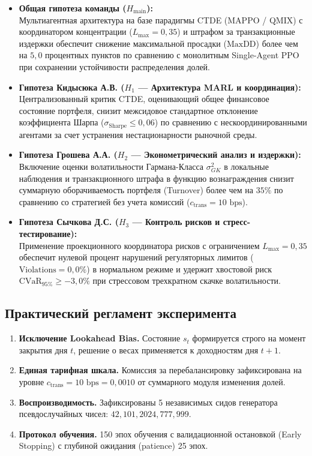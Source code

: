\documentclass[11pt,a4paper]{article}
\begin{document}
\begin{itemize}[leftmargin=*]
\item \textbf{Общая гипотеза команды ($H_{\text{main}}$):}\\
Мультиагентная архитектура на базе парадигмы CTDE (MAPPO / QMIX) с координатором концентрации ($L_{\max} = 0{,}35$) и штрафом за транзакционные издержки обеспечит снижение максимальной просадки ($\text{MaxDD}$) более чем на $5{,}0$ процентных пунктов по сравнению с монолитным Single-Agent PPO при сохранении устойчивости распределения долей.

\item \textbf{Гипотеза Кидысюка А.В. ($H_1$ --- Архитектура MARL и координация):}\\
Централизованный критик CTDE, оценивающий общее финансовое состояние портфеля, снизит межсидовое стандартное отклонение коэффициента Шарпа ($\sigma_{\text{Sharpe}} \le 0{,}06$) по сравнению с нескоординированными агентами за счет устранения нестационарности рыночной среды.

\item \textbf{Гипотеза Грошева А.А. ($H_2$ --- Эконометрический анализ и издержки):}\\
Включение оценки волатильности Гармана-Класса $\sigma_{GK}^2$ в локальные наблюдения и транзакционного штрафа в функцию вознаграждения снизит суммарную оборачиваемость портфеля (Turnover) более чем на $35\%$ по сравнению со стратегией без учета комиссий ($c_{\text{trans}} = 10 \text{ bps}$).

\item \textbf{Гипотеза Сычкова Д.С. ($H_3$ --- Контроль рисков и стресс-тестирование):}\\
Применение проекционного координатора рисков с ограничением $L_{\max} = 0{,}35$ обеспечит нулевой процент нарушений регуляторных лимитов ($\text{Violations} = 0{,}0\%$) в нормальном режиме и удержит хвостовой риск $\text{CVaR}_{95\%} \ge -3{,}0\%$ при стрессовом трехкратном скачке волатильности.
\end{itemize}

\subsection{Практический регламент эксперимента}

\begin{enumerate}[leftmargin=*]
\item \textbf{Исключение Lookahead Bias.} Состояние $s_t$ формируется строго на момент закрытия дня $t$, решение о весах применяется к доходностям дня $t+1$.
\item \textbf{Единая тарифная шкала.} Комиссия за перебалансировку зафиксирована на уровне $c_{\text{trans}} = 10 \text{ bps} = 0{,}0010$ от суммарного модуля изменения долей.
\item \textbf{Воспроизводимость.} Зафиксированы 5 независимых сидов генератора псевдослучайных чисел: $42, 101, 2024, 777, 999$.
\item \textbf{Протокол обучения.} 150 эпох обучения с валидационной остановкой (Early Stopping) с глубиной ожидания (patience) 25 эпох.
\end{enumerate}
\end{document}

